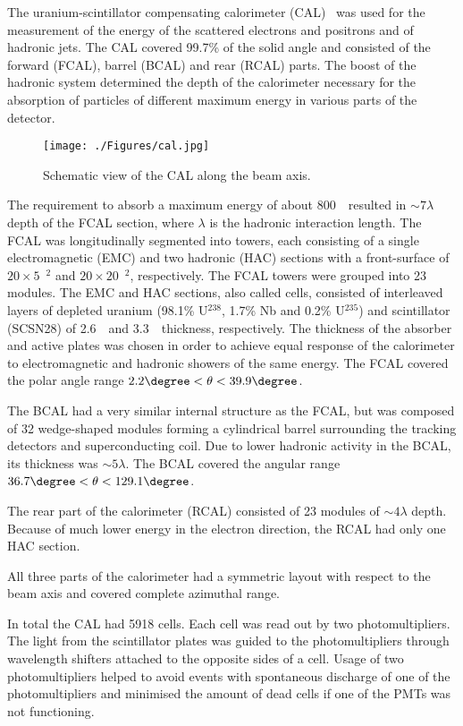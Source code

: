 The uranium-scintillator compensating calorimeter (CAL)~\cite{thesis:kruger:1992,nim:a309:77,nim:a309:101,nim:a321:356,nim:a336:23} was used for the measurement of the energy of the scattered electrons and positrons and of hadronic jets. The CAL covered 99.7\% of the solid angle and consisted of the forward (FCAL), barrel (BCAL) and rear (RCAL) parts. The boost of the hadronic system determined the depth of the calorimeter necessary for the absorption of particles of different maximum energy in various parts of the detector.
\begin{figure}[h]
	\centering
		\texttt{[image: ./Figures/cal.jpg]}
	\caption{Schematic view of the CAL along the beam axis.}
	\label{fig:cal}
\end{figure}

The requirement to absorb a maximum energy of about 800~\GeV\, resulted in $\sim 7 \lambda$ depth of the FCAL section, where $\lambda$ is the hadronic interaction length. The FCAL was longitudinally segmented into towers, each consisting of a single electromagnetic (EMC) and two hadronic (HAC) sections with a front-surface of $20 \times 5$~\cm$^{2}$ and $20 \times 20$~\cm$^{2}$, respectively. The FCAL towers were grouped into 23 modules. The EMC and HAC sections, also called cells, consisted of interleaved layers of depleted uranium (98.1\% U$^{238}$, 1.7\% Nb and 0.2\% U$^{235}$) and scintillator (SCSN28) of 2.6~\mm\, and 3.3~\mm\, thickness, respectively. The thickness of the absorber and active plates was chosen in order to achieve equal response of the calorimeter to electromagnetic and hadronic showers of the same energy. The FCAL covered the polar angle range $2.2\degree < \theta < 39.9\degree$.

The BCAL had a very similar internal structure as the FCAL, but was composed of 32 wedge-shaped modules forming a cylindrical barrel surrounding the tracking detectors and superconducting coil. Due to lower hadronic activity in the BCAL, its thickness was $\sim 5 \lambda$. The BCAL covered the angular range $36.7\degree< \theta <129.1\degree$.

The rear part of the calorimeter (RCAL) consisted of 23 modules of $\sim 4 \lambda$ depth. Because of much lower energy in the electron direction, the RCAL had only one HAC section.

All three parts of the calorimeter had a symmetric layout with respect to the beam axis and covered complete azimuthal range.

In total the CAL had 5918 cells. Each cell was read out by two photomultipliers. The light from the scintillator plates was guided to the photomultipliers through wavelength shifters attached to the opposite sides of a cell. Usage of two photomultipliers helped to avoid events with spontaneous discharge of one of the photomultipliers and minimised the amount of dead cells if one of the PMTs was not functioning.

